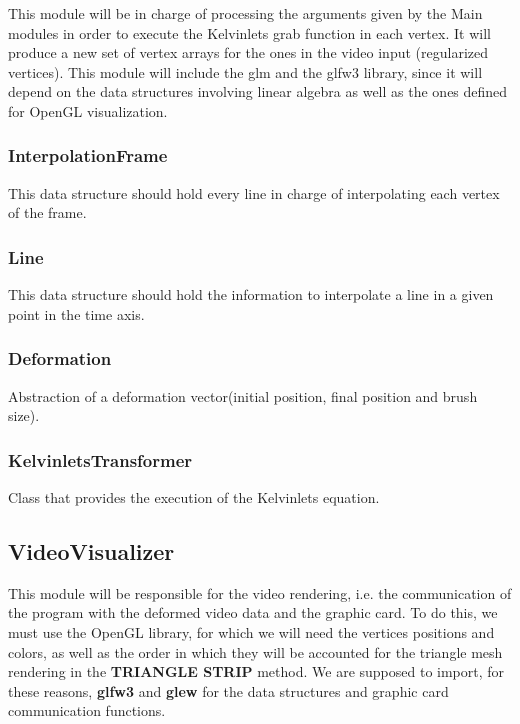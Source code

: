 \documentclass[11pt]{article}
\begin{document}
This module will be in charge of processing the arguments given by the Main modules in order to execute the Kelvinlets grab function in each vertex. It will produce a new set of vertex arrays for the ones in the video input (regularized vertices). This module will include the glm and the glfw3 library, since it will depend on the data structures involving linear algebra as well as the ones defined for OpenGL visualization.

\subsubsection*{InterpolationFrame}
\label{sec:org0d558a2}

This data structure should hold every line in charge of interpolating each vertex of the frame.

\subsubsection*{Line}
\label{sec:orgaf0ec32}

This data structure should hold the information to interpolate a line in a given point in the time axis.

\subsubsection*{Deformation}
\label{sec:org3435212}

Abstraction of a deformation vector(initial position, final position and brush size).

\subsubsection*{KelvinletsTransformer}
\label{sec:orgd60f6f1}

Class that provides the execution of the Kelvinlets equation.

\subsection*{VideoVisualizer}
\label{sec:org8e3e481}

This module will be responsible for the video rendering, i.e. the communication of the program with the deformed video data and the graphic card. To do this, we must use the OpenGL library, for which we will need the vertices positions and colors, as well as the order in which they will be accounted for the triangle mesh rendering in the \textbf{TRIANGLE STRIP} method. We are supposed to import, for these reasons, \textbf{glfw3} and \textbf{glew} for the data structures and graphic card communication functions.
\end{document}
